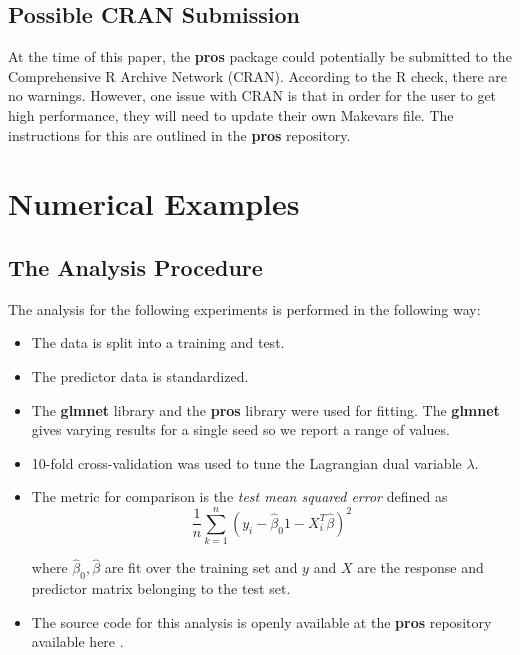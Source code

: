 \documentclass[article]{jss}
\numberwithin{equation}{section}
\begin{document}
\subsection{Possible CRAN Submission}

At the time of this paper, the \textbf{pros} package could potentially be submitted to the Comprehensive R Archive Network (CRAN).
According to the R check, there are no warnings.
However, one issue with CRAN is that in order for the user to get high performance, they will need to update their own Makevars file. The instructions for this are outlined in the \textbf{pros} repository.

\section{Numerical Examples}

\subsection{The Analysis Procedure}

The analysis for the following experiments is performed in the following way:

\begin{itemize}

\item The data is split into a training and test.

\item The predictor data is standardized.

\item The \textbf{glmnet} library and the \textbf{pros} library were used for fitting. The \textbf{glmnet} gives varying results for a single seed so we report a range of values.

\item 10-fold cross-validation was used to tune the Lagrangian dual variable $\lambda$.

\item The metric for comparison is the \textit{test mean squared error} defined as
\[
\frac{1}{n}\sum_{k = 1}^n \left( y_i - \hat \beta_0 1 - X_i^T \hat \beta \right)^2
\]

where $\hat \beta_0, \hat \beta$ are fit over the training set and $y$ and $X$ are the response and predictor matrix belonging to the test set.

\item The source code for this analysis is openly available at the \textbf{pros} repository available here \cite{pros}.

\end{itemize}
\end{document}
